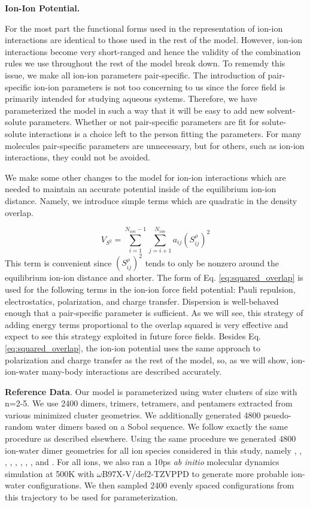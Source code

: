 \documentclass[journal=jctcce,manuscript=article]{achemso}
\begin{document}
\textbf{Ion-Ion Potential.}

For the most part the functional forms used in the representation of ion-ion interactions are identical to those used in the rest of the model. However, ion-ion interactions become very short-ranged and hence the validity of the combination rules we use throughout the rest of the model break down. To rememdy this issue, we make all ion-ion parameters pair-specific. The introduction of pair-specific ion-ion parameters is not too concerning to us since the force field is primarily intended for studying aqueous systems. Therefore, we have parameterized the model in such a way that it will be easy to add new solvent-solute parameters. Whether or not pair-specific parameters are fit for solute-solute interactions is a choice left to the person fitting the parameters. For many molecules pair-specific parameters are unnecessary, but for others, such as ion-ion interactions, they could not be avoided.

We make some other changes to the model for ion-ion interactions which are needed to maintain an accurate potential inside of the equilibrium ion-ion distance. Namely, we introduce simple terms which are quadratic in the density overlap.

\begin{equation}
  V_{S^2}=\sum_{i=1}^{N_{ion}-1}\sum_{j=i+1}^{N_{ion}}a_{ij}(S_{ij}^\rho)^2
  \label{eq:squared_overlap}
\end{equation}
\noindent
This term is convenient since $(S_{ij}^\rho)^2$ tends to only be nonzero around the equilibrium ion-ion distance and shorter. The form of Eq. \ref{eq:squared_overlap} is used for the following terms in the ion-ion force field potential: Pauli repulsion, electrostatics, polarization, and charge transfer. Dispersion is well-behaved enough that a pair-specific parameter is sufficient. As we will see, this strategy of adding energy terms proportional to the overlap squared is very effective and expect to see this strategy exploited in future force fields. Besides Eq. \ref{eq:squared_overlap}, the ion-ion potential uses the same approach to polarization and charge transfer as the rest of the model, so, as we will show, ion-ion-water many-body interactions are described accurately.

\textbf{Reference Data}. Our model is parameterized using water clusters of size  with n=2-5. We use 2400 dimers, trimers, tetramers, and pentamers extracted from various minimized cluster geometries. We additionally generated 4800 psuedo-random water dimers based on a Sobol sequence. We follow exactly the same procedure as described elsewhere.\cite{misquitta2008first} Using the same procedure we generated 4800 ion-water dimer geometries for all ion species considered in this study, namely , , , , , , , , and . For all ions, we also ran a 10ps \textit{ab initio} molecular dynamics simulation at 500K with $\omega$B97X-V/def2-TZVPPD to generate more probable ion-water configurations. We then sampled 2400 evenly spaced configurations from this trajectory to be used for parameterization.
\end{document}
